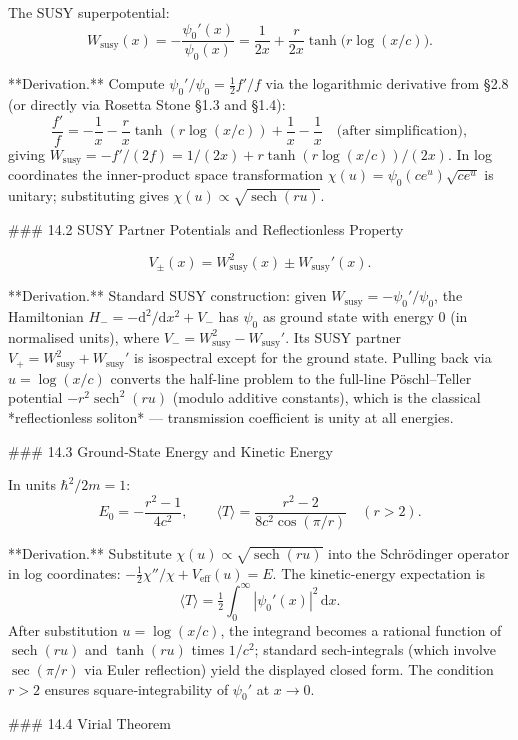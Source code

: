 The SUSY superpotential:
$$
W_{\text{susy}}(x) = -\frac{\psi_{0}'(x)}{\psi_{0}(x)} = \frac{1}{2x} + \frac{r}{2x}\tanh\!\bigl(r\log(x/c)\bigr).
$$

**Derivation.** Compute $\psi_{0}'/\psi_{0} = \tfrac{1}{2}f'/f$ via the logarithmic derivative from §2.8 (or directly via Rosetta Stone §1.3 and §1.4):
$$
\frac{f'}{f} = -\frac{1}{x} - \frac{r}{x}\tanh(r\log(x/c)) + \frac{1}{x} - \frac{1}{x}\quad\text{(after simplification)},
$$
giving $W_{\text{susy}} = -f'/(2f) = 1/(2x) + r\tanh(r\log(x/c))/(2x)$. In log coordinates the inner-product space transformation $\chi(u) = \psi_{0}(ce^{u})\sqrt{ce^{u}}$ is unitary; substituting gives $\chi(u) \propto \sqrt{\operatorname{sech}(ru)}$.

### 14.2 SUSY Partner Potentials and Reflectionless Property

$$
V_{\pm}(x) = W_{\text{susy}}^{2}(x) \pm W_{\text{susy}}'(x).
$$

**Derivation.** Standard SUSY construction: given $W_{\text{susy}} = -\psi_{0}'/\psi_{0}$, the Hamiltonian $H_{-} = -\mathrm d^{2}/\mathrm dx^{2} + V_{-}$ has $\psi_{0}$ as ground state with energy 0 (in normalised units), where $V_{-} = W_{\text{susy}}^{2} - W_{\text{susy}}'$. Its SUSY partner $V_{+} = W_{\text{susy}}^{2} + W_{\text{susy}}'$ is isospectral except for the ground state. Pulling back via $u=\log(x/c)$ converts the half-line problem to the full-line Pöschl–Teller potential $-r^{2}\operatorname{sech}^{2}(ru)$ (modulo additive constants), which is the classical *reflectionless soliton* — transmission coefficient is unity at all energies.

### 14.3 Ground‑State Energy and Kinetic Energy

In units $\hbar^{2}/2m = 1$:
$$
E_{0} = -\frac{r^{2}-1}{4c^{2}},\qquad \langle T\rangle = \frac{r^{2}-2}{8c^{2}\cos(\pi/r)}\quad(r>2).
$$

**Derivation.** Substitute $\chi(u)\propto\sqrt{\operatorname{sech}(ru)}$ into the Schrödinger operator in log coordinates: $-\tfrac{1}{2}\chi''/\chi + V_{\text{eff}}(u) = E$. The kinetic-energy expectation is
$$
\langle T\rangle = \tfrac{1}{2}\int_{0}^{\infty}|\psi_{0}'(x)|^{2}\,\mathrm dx.
$$
After substitution $u=\log(x/c)$, the integrand becomes a rational function of $\operatorname{sech}(ru)$ and $\tanh(ru)$ times $1/c^{2}$; standard sech-integrals (which involve $\sec(\pi/r)$ via Euler reflection) yield the displayed closed form. The condition $r>2$ ensures square‑integrability of $\psi_{0}'$ at $x\to 0$.

### 14.4 Virial Theorem

